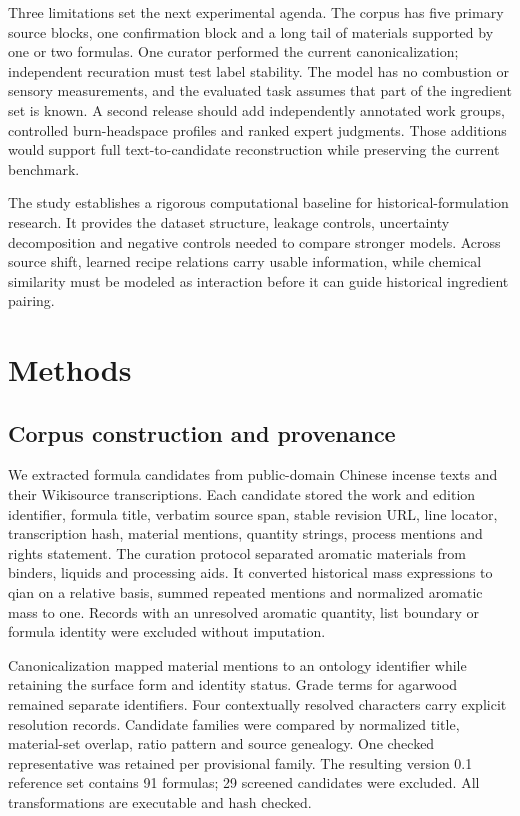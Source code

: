 \documentclass[12pt]{article}
\begin{document}
Three limitations set the next experimental agenda. The corpus has five primary source blocks, one confirmation block and a long tail of materials supported by one or two formulas. One curator performed the current canonicalization; independent recuration must test label stability. The model has no combustion or sensory measurements, and the evaluated task assumes that part of the ingredient set is known. A second release should add independently annotated work groups, controlled burn-headspace profiles and ranked expert judgments. Those additions would support full text-to-candidate reconstruction while preserving the current benchmark.

The study establishes a rigorous computational baseline for historical-formulation research. It provides the dataset structure, leakage controls, uncertainty decomposition and negative controls needed to compare stronger models. Across source shift, learned recipe relations carry usable information, while chemical similarity must be modeled as interaction before it can guide historical ingredient pairing.

\section*{Methods}

\subsection*{Corpus construction and provenance}

We extracted formula candidates from public-domain Chinese incense texts and their Wikisource transcriptions. Each candidate stored the work and edition identifier, formula title, verbatim source span, stable revision URL, line locator, transcription hash, material mentions, quantity strings, process mentions and rights statement. The curation protocol separated aromatic materials from binders, liquids and processing aids. It converted historical mass expressions to qian on a relative basis, summed repeated mentions and normalized aromatic mass to one. Records with an unresolved aromatic quantity, list boundary or formula identity were excluded without imputation.

Canonicalization mapped material mentions to an ontology identifier while retaining the surface form and identity status. Grade terms for agarwood remained separate identifiers. Four contextually resolved characters carry explicit resolution records. Candidate families were compared by normalized title, material-set overlap, ratio pattern and source genealogy. One checked representative was retained per provisional family. The resulting version 0.1 reference set contains 91 formulas; 29 screened candidates were excluded. All transformations are executable and hash checked.
\end{document}
